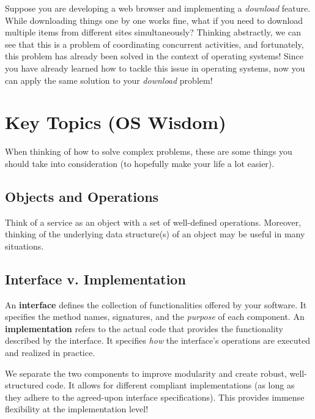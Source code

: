 \documentclass{report}
\begin{document}
\begin{tcolorbox}[colback=blue!5!white,colframe=black!75!blue,title=Example: Difficult Downloads]
  Suppose you are developing a web browser and implementing a \textit{download} feature. While
  downloading things one by one works fine, what if you need to download multiple items from different
  sites simultaneously? Thinking abstractly, we can see that this is a problem of coordinating
  concurrent activities, and fortunately, this problem has already been solved in the context of
  operating systems! Since you have already learned how to tackle this issue in operating systems, now
  you can apply the same solution to your \textit{download} problem!
\end{tcolorbox}





\section{Key Topics (OS Wisdom)}
When thinking of how to solve complex problems, these are some things you should take into
consideration (to hopefully make your life a lot easier).


\subsection*{Objects and Operations}
Think of a service as an object with a set of well-defined operations. Moreover, thinking of the
underlying data structure(s) of an object may be useful in many situations.  


\subsection*{Interface v. Implementation}
\begin{tcolorbox}[title=Definition: Interface and Implementation]
  An \textbf{interface} defines the collection of functionalities offered by your software. It
  specifies the method names, signatures, and the \textit{purpose} of each component. 
  \tcblower
  An \textbf{implementation} refers to the actual code that provides the functionality described by
  the interface. It specifies \textit{how} the interface's operations are executed and realized in practice. 
\end{tcolorbox}
We separate the two components to improve modularity and create robust, well-structured code. It
allows for different compliant implementations (as long as they adhere to the agreed-upon interface
specifications). This provides immense flexibility at the implementation level!
\end{document}
